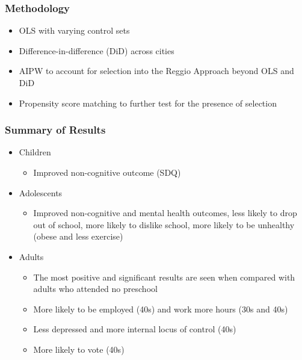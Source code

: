 \documentclass[static]{JJH-Beamer_PAGENOS}
\begin{document}
\begin{frame}
\frametitle{Methodology}
\begin{itemize}
	\item OLS with varying control sets 
	\item Difference-in-difference (DiD) across cities 
	\item AIPW to account for selection into the Reggio Approach beyond OLS and DiD
	\item Propensity score matching to further test for the presence of selection 
\end{itemize}
\end{frame}


\begin{frame}
\frametitle{Summary of Results}
\begin{itemize}
	\item Children
	\begin{itemize}
		\item Improved non-cognitive outcome (SDQ)
	\end{itemize}
	\item Adolescents
	\begin{itemize}
		\item Improved non-cognitive and mental health outcomes, less likely to drop out of school, more likely to dislike school, more likely to be unhealthy (obese and less exercise)
	\end{itemize}
	\item Adults
		\begin{itemize}
		\item The most positive and significant results are seen when compared with adults who attended no preschool
		\item More likely to be employed (40s) and work more hours (30s and 40s)
		\item Less depressed and more internal locus of control (40s)
		\item More likely to vote (40s)
		\end{itemize}
\end{itemize}
\end{frame}

\end{document}
